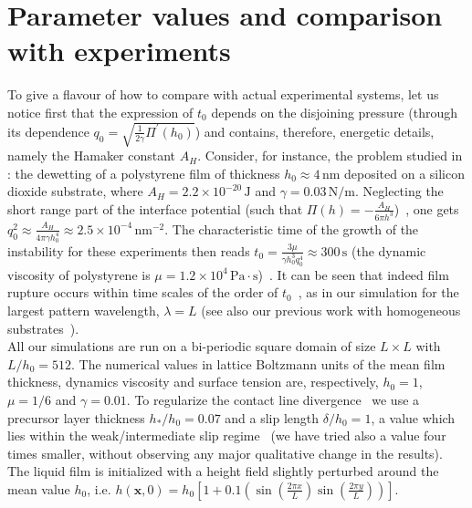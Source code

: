 \documentclass[amsmath,amssymb,showpacs,prf,superscriptaddress,notitlepage,longbibliography]{revtex4-1}
\begin{document}
\section{Parameter values and comparison with experiments}\label{sec:SMparam}

\noindent To give a flavour of how to compare with actual experimental systems, let us notice first that the expression of $t_0$ depends on the disjoining pressure (through its dependence $q_0 = \sqrt{\frac{1}{2\gamma} \Pi^{\prime}(h_0)}$) and contains, therefore, energetic details, namely the Hamaker constant $A_H$. 
Consider, for instance, the problem studied in \cite{beckerComplexDewettingScenarios2003}: the dewetting of a polystyrene film of thickness $h_0 \approx 4 \, \text{nm}$ deposited on a silicon dioxide substrate, where $A_H  = 2.2 \times 10^{-20} \, \text{J}$ and $\gamma = 0.03 \, \text{N}/\text{m}$. 
Neglecting the short range part of the interface potential (such that $\Pi(h)= - \frac{A_H}{6\pi h^3}$)~\cite{meckeThermalFluctuationsThin2005,beckerComplexDewettingScenarios2003}, one gets $q_0^2 \approx \frac{A_H}{4\pi \gamma h_0^4} \approx 2.5 \times 10^{-4} \, \text{nm}^{-2}$.
The characteristic time of the growth of the instability for these experiments then reads $t_0 = \frac{3\mu}{\gamma h_0^3 q_0^4} \approx 300 \, \text{s}$ (the dynamic viscosity of polystyrene is $\mu = 1.2 \times 10^4 \, \text{Pa} \cdot \text{s}$)~\cite{fetzerThermalNoiseInfluences2007}. 
It can be seen that indeed film rupture occurs within time scales of the order of $t_0$~\cite{beckerComplexDewettingScenarios2003}, as in our simulation for the largest pattern wavelength, $\lambda = L$ (see also our previous work with homogeneous substrates~\cite{zitzLatticeBoltzmannSimulations2021}).\\
All our simulations are run on a bi-periodic square domain of size $L \times L$ with $L/h_0 = 512 $. 
The numerical values in lattice Boltzmann units of the mean film thickness, dynamics viscosity and surface tension are, respectively, $h_0=1$, $\mu=1/6$ and $\gamma=0.01$.
To regularize the contact line divergence~\cite{huhHydrodynamicModelSteady1971} we use a precursor layer thickness $h_{\ast}/h_0=0.07$ and a slip length $\delta/h_0 = 1$, a value which lies within the weak/intermediate slip regime~\cite{peschkaSignaturesSlipDewetting2019,fetzerQuantifyingHydrodynamicSlip2007, munchLubricationModelsSmall2005a} (we have tried also a value four times smaller, without observing any major qualitative change in the results).
The liquid film is initialized with a height field slightly perturbed around the mean value $h_0$, i.e. $h(\mathbf{x},0) = h_0 \left[1 + 0.1 \left(\sin\left(\frac{2\pi x}{L}\right)\sin\left(\frac{2\pi y}{L}\right)\right)\right]$.
\end{document}
